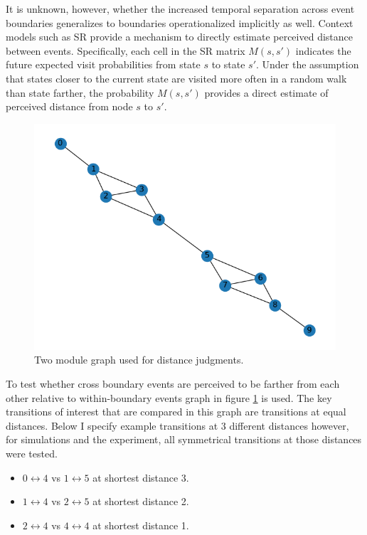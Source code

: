 It is unknown, however, whether the increased temporal separation across event boundaries generalizes to boundaries operationalized implicitly as well. Context models such as SR provide a mechanism to directly estimate perceived distance between events. Specifically, each cell in the SR matrix $M(s, s')$ indicates the future expected visit probabilities from state $s$ to state $s'$. Under the assumption that states closer to the current state are visited more often in a random walk than state farther, the probability $M(s, s')$ provides a direct estimate of perceived distance from node $s$ to $s'$. 

\begin{figure}[ht]
    \centering
    \includegraphics[width = \textwidth]{chapter_notebooks/chapter_3/figures/two_module_graph.png}
    \caption{Two module graph used for distance judgments.}
    \label{fig:two_module_graph}
\end{figure}

To test whether cross boundary events are perceived to be farther from each other relative to within-boundary events graph in figure \ref{fig:two_module_graph} is used. The key transitions of interest that are compared in this graph are transitions at equal distances. Below I specify example transitions at 3 different distances however, for simulations and the experiment, all symmetrical transitions at those distances were tested. 
\begin{itemize}
    \item $0 \leftrightarrow 4$ vs $1 \leftrightarrow 5$ at shortest distance 3. 
    \item $1 \leftrightarrow 4$ vs $2 \leftrightarrow 5$ at shortest distance 2. 
    \item $2 \leftrightarrow 4$ vs $4 \leftrightarrow 4$ at shortest distance 1. 
\end{itemize}

